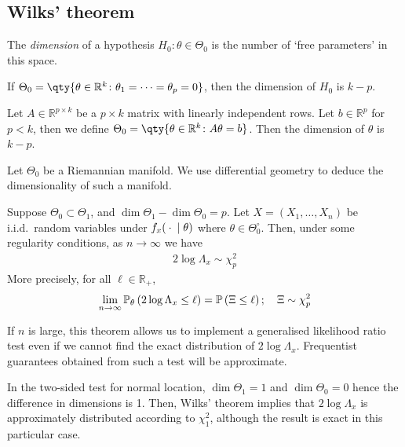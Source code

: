 \subsection{Wilks' theorem}
\begin{definition}
	The \textit{dimension} of a hypothesis $H_0 \colon \theta \in \Theta_0$ is the number of `free parameters' in this space.
\end{definition}
\begin{example}
	If $\Theta_0 = \qty{\theta \in \mathbb R^k \colon \theta_1 = \dots = \theta_p = 0 }$, then the dimension of $H_0$ is $k - p$.

	Let $A \in \mathbb R^{p \times k}$ be a $p \times k$ matrix with linearly independent rows.
	Let $b \in \mathbb R^p$ for $p < k$, then we define $\Theta_0 = \qty{\theta \in \mathbb R^k \colon A\theta = b}$.
	Then the dimension of $\theta$ is $k - p$.

	Let $\Theta_0$ be a Riemannian manifold.
	We use differential geometry to deduce the dimensionality of such a manifold.
\end{example}
\begin{theorem}
	Suppose $\Theta_0 \subset \Theta_1$, and $\dim \Theta_1 - \dim \Theta_0 = p$.
	Let $X = (X_1, \dots, X_n)$ be i.i.d.\ random variables under $f_x({}\cdot{}\mid\theta)$ where $\theta \in \Theta_0^\circ$.
	Then, under some regularity conditions, as $n \to \infty$ we have
	\begin{align*}
		2\log\Lambda_x \sim \chi_p^2
	\end{align*}
	More precisely, for all $\ell \in \mathbb R_+$,
	\begin{align*}
		\lim_{n \to \infty} \mathbb{P}_{\theta}\left({2\log \Lambda_x \leq \ell}\right) = \mathbb{P}\left({\Xi \leq \ell}\right);\quad \Xi \sim \chi_p^2
	\end{align*}
\end{theorem}
\begin{remark}
	If $n$ is large, this theorem allows us to implement a generalised likelihood ratio test even if we cannot find the exact distribution of $2 \log \Lambda_x$.
	Frequentist guarantees obtained from such a test will be approximate.
\end{remark}
\begin{example}
	In the two-sided test for normal location, $\dim \Theta_1 = 1$ and $\dim \Theta_0 = 0$ hence the difference in dimensions is 1.
	Then, Wilks' theorem implies that $2 \log \Lambda_x$ is approximately distributed according to $\chi_1^2$, although the result is exact in this particular case.
\end{example}

